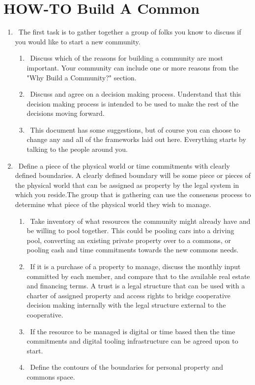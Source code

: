 	\section{HOW-TO Build A Common}


\begin{enumerate}
	
	\item \checkbox\ The first task is to gather together a group of folks you know to discuss if you would like to start a new community. 
	\begin{enumerate}
		\item \checkbox\ Discuss which of the reasons for building a community are most important. Your community can include one or more reasons from the "Why Build a Community?" section. 
		\item \checkbox\ Discuss and agree on a decision making process. Understand that this decision making process is intended to be used to make the rest of the decisions moving forward. 
		\item \checkbox\ This document has some suggestions, but of course you can choose to change any and all of the frameworks laid out here. Everything starts by talking to the people around you. 
	\end{enumerate}
	
	\item \checkbox\ Define a piece of the physical world or time commitments with clearly defined boundaries. A clearly defined boundary will be some piece or pieces of the physical world that can be assigned as property by the legal system in which you reside.The group that is gathering can use the consensus process to determine what piece of the physical world they wish to manage.
	\begin{enumerate}
		
	 \item \checkbox\ Take inventory of what resources the community might already have and be willing to pool together. This could be pooling cars into a driving pool, converting an existing private property over to a commons, or pooling cash and time commitments towards the new commons needs. 	
	 
	 \item \checkbox\  If it is a purchase of a property to manage, discuss the monthly input committed by each member, and compare that to the available real estate and financing terms. A trust is a legal structure that can be used with a charter of assigned property and access rights to bridge cooperative decision making internally with the legal structure external to the cooperative. 
	 \item \checkbox\ If the resource to be managed is digital or time based then the time commitments and digital tooling infrastructure can be agreed upon to start. 
	 \item \checkbox\ Define the contours of the boundaries for personal property and commons space. 
	 

\end{enumerate}
\end{enumerate}
